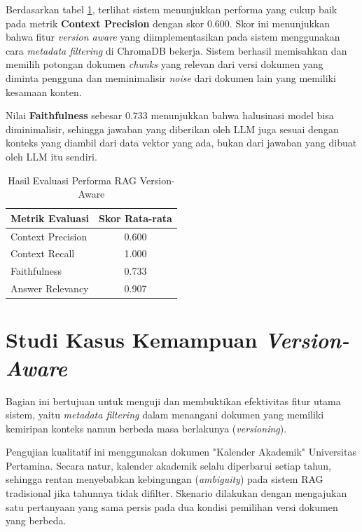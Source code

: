 Berdasarkan tabel \ref{tab:hasil_evaluasi}, terlihat sistem menunjukkan performa yang cukup baik pada metrik \textbf{Context Precision} dengan skor 0.600. Skor ini menunjukkan bahwa fitur \textit{version aware} yang
diimplementasikan pada sistem menggunakan cara \textit{metadata filtering} di ChromaDB bekerja. Sistem berhasil memisahkan dan memilih potongan dokumen \textit{chunks} yang relevan dari versi dokumen yang diminta
pengguna dan meminimalisir \textit{noise} dari dokumen lain yang memiliki kesamaan konten.

Nilai \textbf{Faithfulness} sebesar 0.733 menunjukkan bahwa halusinasi model bisa diminimalisir, sehingga jawaban yang diberikan oleh LLM juga sesuai dengan konteks yang diambil dari data vektor yang ada, bukan dari jawaban yang dibuat oleh LLM itu sendiri.


\begin{table}[h!]
    \centering
    \caption{Hasil Evaluasi Performa RAG Version-Aware}
    \label{tab:hasil_evaluasi}
    \begin{tabular}{|l|c|}
        \hline
        \textbf{Metrik Evaluasi} & \textbf{Skor Rata-rata} \\ \hline
        Context Precision & 0.600 \\ \hline
        Context Recall & 1.000 \\ \hline
        Faithfulness & 0.733 \\ \hline
        Answer Relevancy & 0.907 \\ \hline
    \end{tabular}
\end{table}

\section{Studi Kasus Kemampuan \textit{Version-Aware}}
\label{sec:studi_kasus}

Bagian ini bertujuan untuk menguji dan membuktikan efektivitas fitur utama sistem, yaitu \textit{metadata filtering} dalam menangani dokumen yang memiliki kemiripan konteks namun berbeda masa berlakunya (\textit{versioning}). 

Pengujian kualitatif ini menggunakan dokumen "Kalender Akademik" Universitas Pertamina. Secara natur, kalender akademik selalu diperbarui setiap tahun, sehingga rentan menyebabkan kebingungan (\textit{ambiguity}) pada sistem RAG tradisional jika tahunnya tidak difilter. Skenario dilakukan dengan mengajukan satu pertanyaan yang sama persis pada dua kondisi pemilihan versi dokumen yang berbeda.

